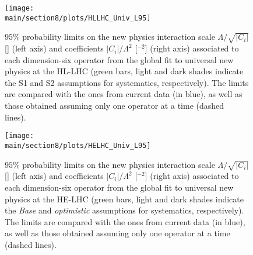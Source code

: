 \begin{figure}[h]
\centering
  \hspace{-0.1cm}\texttt{[image: \\main/section8/plots/HLLHC\_Univ\_L95]}
  \vspace{-0.2cm}
  \caption{$95\%$ probability limits on the new physics interaction scale $\Lambda/\sqrt{\vert C_i\vert}$ [\UTeV] (left axis) and coefficients $\vert C_i\vert /\Lambda^2$ [\UTeV$^{-2}$] (right axis) associated to each dimension-six operator from the global fit to universal new physics at the HL-LHC (green bars, light and dark shades indicate the S1 and S2 assumptions for systematics, respectively). The limits are compared with the ones from current data (in blue), as well as those obtained assuming only one operator at a time (dashed lines).~\label{fig:dim6U_HLLHC}}
\end{figure}

\begin{figure}[h]
\centering
  \hspace{-0.1cm}\texttt{[image: \\main/section8/plots/HELHC\_Univ\_L95]}
  \vspace{-0.2cm}
   \caption{$95\%$ probability limits on the new physics interaction scale $\Lambda/\sqrt{\vert C_i\vert }$ [\UTeV] (left axis) and coefficients $\vert C_i\vert/\Lambda^2$ [\UTeV$^{-2}$] (right axis) associated to each dimension-six operator from the global fit to universal new physics at the HE-LHC (green bars, light and dark shades indicate the {\it Base} and {\it optimistic} assumptions for systematics, respectively). The limits are compared with the ones from current data (in blue), as well as those obtained assuming only one operator at a time (dashed lines).~\label{fig:dim6U_HELHC}}
\end{figure}

